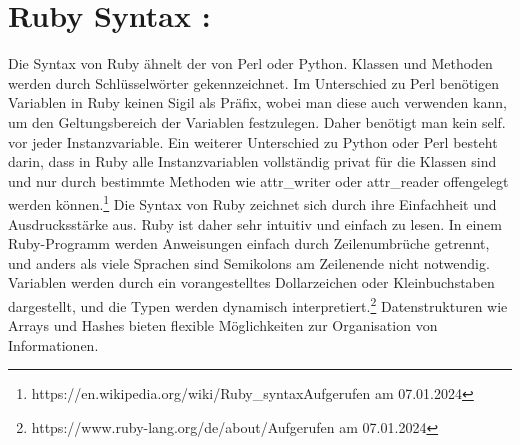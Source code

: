 \documentclass{article}
\begin{document}
\section*{
Ruby Syntax :}

Die Syntax von Ruby ähnelt der von Perl oder Python. Klassen und Methoden werden durch Schlüsselwörter gekennzeichnet. Im Unterschied zu Perl benötigen Variablen in Ruby keinen Sigil als Präfix, wobei man diese auch verwenden kann, um den Geltungsbereich der Variablen festzulegen. Daher benötigt man kein \glqq self\grqq{}. vor jeder Instanzvariable.
Ein weiterer Unterschied zu Python oder Perl besteht darin, dass in Ruby alle Instanzvariablen vollständig privat für die Klassen sind und nur durch bestimmte Methoden wie attr\_writer oder attr\_reader offengelegt werden können.\footnote{https://en.wikipedia.org/wiki/Ruby\_syntaxAufgerufen am 07.01.2024}
Die Syntax von Ruby zeichnet sich durch ihre Einfachheit und Ausdrucksstärke aus. Ruby ist daher sehr intuitiv und einfach zu lesen. In einem Ruby-Programm werden Anweisungen einfach durch Zeilenumbrüche getrennt, und anders als viele Sprachen sind Semikolons am Zeilenende nicht notwendig.
Variablen werden durch ein vorangestelltes Dollarzeichen oder Kleinbuchstaben dargestellt, und die Typen werden dynamisch interpretiert.\footnote{https://www.ruby-lang.org/de/about/Aufgerufen am 07.01.2024} Datenstrukturen wie Arrays und Hashes bieten flexible Möglichkeiten zur Organisation von Informationen.
\end{document}
